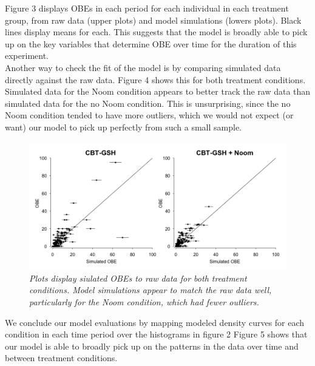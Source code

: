 \documentclass[12pt, oneside]{article}
\begin{document}
Figure 3 displays OBEs in each period for each individual in each treatment group, from raw data (upper plots) and model simulations (lowers plots).  Black lines display means for each.  This suggests that the model is broadly able to pick up on the key variables that determine OBE over time for the duration of this experiment.
\\

Another way to check the fit of the model is by comparing simulated data directly against the raw data.  Figure 4 shows this for both treatment conditions.  Simulated data for the Noom condition appears to better track the raw data than simulated data for the no Noom condition.  This is unsurprising, since the no Noom condition tended to have more outliers, which we would not expect (or want) our model to pick up perfectly from such a small sample.  
\\

\begin{figure}
\centering
\includegraphics[width=\textwidth, height=\textheight, keepaspectratio]{obe_ppcs.png}
\caption{\emph{Plots display siulated OBEs to raw data for both treatment conditions.  Model simulations appear to match the raw data well, particularly for the Noom condition, which had fewer outliers.}}
\end{figure}

We conclude our model evaluations by mapping modeled density curves for each condition in each time period over the histograms in figure 2  Figure 5 shows that our model is able to broadly pick up on the patterns in the data over time and between treatment conditions.
\end{document}
